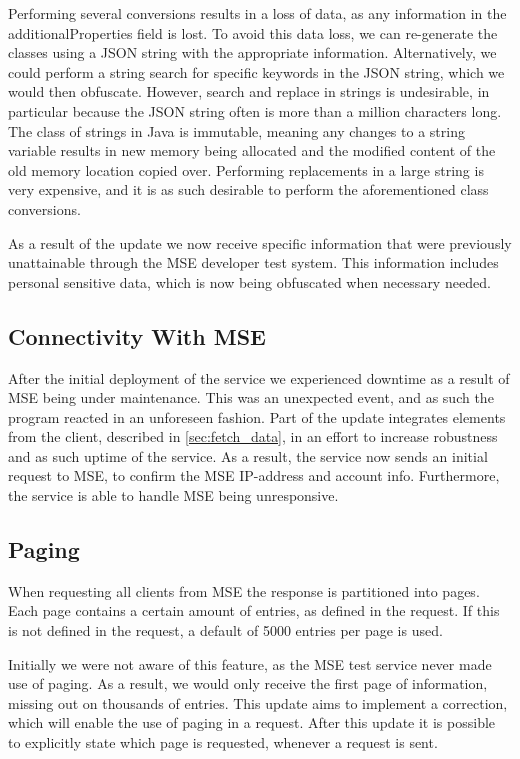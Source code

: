 Performing several conversions results in a loss of data, as any information in the additionalProperties field is lost. To avoid this data loss, we can re-generate the classes using a JSON string with the appropriate information. Alternatively, we could perform a string search for specific keywords in the JSON string, which we would then obfuscate. However, search and replace in strings is undesirable, in particular because the JSON string often is more than a million characters long. The class of strings in Java is immutable, meaning any changes to a string variable results in new memory being allocated and the modified content of the old memory location copied over. Performing replacements in a large string is very expensive, and it is as such desirable to perform the aforementioned class conversions. 

As a result of the update we now receive specific information that were previously unattainable through the MSE developer test system. This information includes personal sensitive data, which is now being obfuscated when necessary needed. 

\subsection{Connectivity With MSE}
After the initial deployment of the service we experienced downtime as a result of MSE being under maintenance. This was an unexpected event, and as such the program reacted in an unforeseen fashion. Part of the update integrates elements from the client, described in \ref{sec:fetch_data}, in an effort to increase robustness and as such uptime of the service. As a result, the service now sends an initial request to MSE, to confirm the MSE IP-address and account info. Furthermore, the service is able to handle MSE being unresponsive.

\subsection{Paging}
When requesting all clients from MSE the response is partitioned into pages. Each page contains a certain amount of entries, as defined in the request. If this is not defined in the request, a default of 5000 entries per page is used. 

Initially we were not aware of this feature, as the MSE test service never made use of paging. As a result, we would only receive the first page of information, missing out on thousands of entries. This update aims to implement a correction, which will enable the use of paging in a request. After this update it is possible to explicitly state which page is requested, whenever a request is sent.